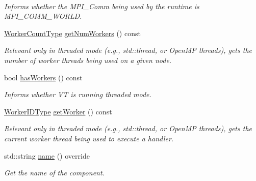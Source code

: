 \begin{DoxyCompactItemize}
$$\begin{DoxyCompactList}\small\item\em Informs whether the M\+P\+I\+\_\+\+Comm being used by the runtime is {\ttfamily M\+P\+I\+\_\+\+C\+O\+M\+M\+\_\+\+W\+O\+R\+LD}. \end{DoxyCompactList}\item 
\hyperlink{namespacevt_aa93398ea48f2cb6c188512250f7cc248}{Worker\+Count\+Type} \hyperlink{structvt_1_1ctx_1_1_context_a0ea881fa8c4d8fee74e85d8a6c52a6f0}{get\+Num\+Workers} () const
\begin{DoxyCompactList}\small\item\em Relevant only in threaded mode (e.\+g., {\ttfamily std\+::thread}, or Open\+MP threads), gets the number of worker threads being used on a given node. \end{DoxyCompactList}\item 
bool \hyperlink{structvt_1_1ctx_1_1_context_a17b1fd9fd7bfc2afdd55707d1f321f76}{has\+Workers} () const
\begin{DoxyCompactList}\small\item\em Informs whether VT is running threaded mode. \end{DoxyCompactList}\item 
\hyperlink{namespacevt_a656e362091da17b9b93d0655b36e3392}{Worker\+I\+D\+Type} \hyperlink{structvt_1_1ctx_1_1_context_a1e39e0561109fd30b45a427ddb055cd2}{get\+Worker} () const
\begin{DoxyCompactList}\small\item\em Relevant only in threaded mode (e.\+g., {\ttfamily std\+::thread}, or Open\+MP threads), gets the current worker thread being used to execute a handler. \end{DoxyCompactList}\item 
std\+::string \hyperlink{structvt_1_1ctx_1_1_context_a6bef35c171d45feb409d7b6aa6168996}{name} () override
\begin{DoxyCompactList}\small\item\em Get the name of the component. \end{DoxyCompactList}\end{DoxyCompactItemize}
